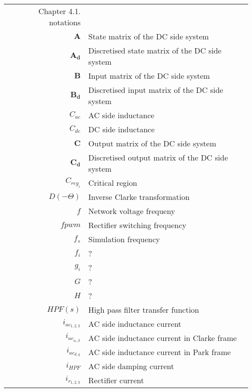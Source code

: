 
\begin{longtable}{r l}
  Chapter 4.1. notations&\\
  $\boldsymbol{A}$                  & State matrix of the DC side system\\
  $\boldsymbol{A_d}$                & Discretised state matrix of the DC side system\\
  $\boldsymbol{B}$                  & Input matrix of the DC side system\\
  $\boldsymbol{B_d}$                & Discretised input matrix of the DC side system\\
  $C_{ac}$                          & AC side inductance\\
  $C_{dc}$                          & DC side inductance\\
  $\boldsymbol{C}$                  & Output matrix of the DC side system\\
  $\boldsymbol{C_d}$                & Discretised output matrix of the DC side system\\
  $C_{reg_i}$                       & Critical region\\
  $D(-\Theta)$                      & Inverse Clarke transformation\\
  $f$                               & Network voltage frequeny\\
  $fpwm$                            & Rectifier switching frequency\\
  $f_s$                             & Simulation frequency\\
  $f_i$                             & ?\\
  $g_i$                             & ?\\
  $G$                               & ?\\
  $H$                               & ?\\
  $HPF(s)$                          & High pass filter transfer function\\
  $i_{ac_{1,2,3}}$                  & AC side inductance current\\
  $i_{ac_{\alpha,\beta}}$           & AC side inductance current in Clarke frame\\
  $i_{ac_{d,q}}$                    & AC side inductance current in Park frame\\
  $i_{HPF}$                         & AC side damping current\\
  $i_{r_{1,2,3}}$                   & Rectifier current\\

\end{longtable}
